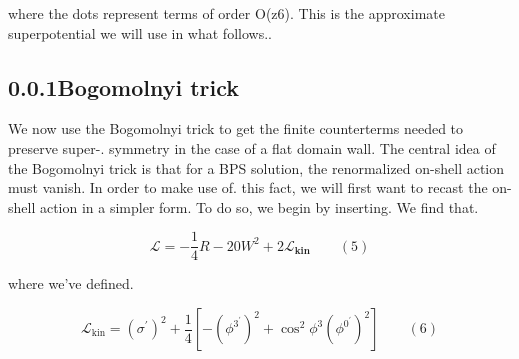 \documentclass{article}
\begin{document}
where the dots represent terms of order O(z6). This is the approximate superpotential we
will use in what follows..


\subsection*{0.0.1Bogomolnyi trick}


We now use the Bogomolnyi trick to get the finite counterterms needed to preserve super-.
symmetry in the case of a flat domain wall. The central idea of the Bogomolnyi trick is that
for a BPS solution, the renormalized on-shell action must vanish. In order to make use of.
this fact, we will first want to recast the on-shell action in a simpler form. To do so, we
begin by inserting. We find that.


\begin{equation}
\mathcal { L } = - \frac { 1 } { 4 } R - 2 0 W ^ { 2 } + 2 \mathcal { L } _ \mathbf { k i n } \qquad ( 5 )
\end{equation}


where we've defined.


\begin{equation}
{ \mathcal { L } } _ { \mathrm { k i n } } = ( \sigma ^ { \prime } ) ^ { 2 } + { \frac { 1 } { 4 } } \left [ - ( { \phi ^ { 3 ^ { \prime } } } ) ^ { 2 } + \cos ^ { 2 } \phi ^ { 3 } ( { \phi ^ { 0 ^ { \prime } } } ) ^ { 2 } \right ] \qquad ( 6 )
\end{equation}
\end{document}
